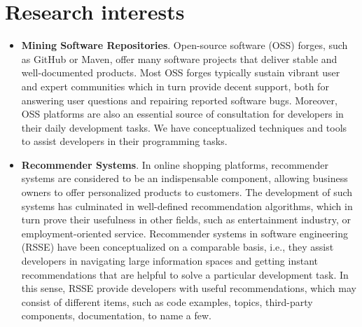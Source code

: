 \documentclass[a4paper,9pt]{article} %
\makeatletter
\newcommand*{\ie}{i.e.,\@\xspace}
\makeatother
\begin{document}
\section{Research interests}
\begin{itemize}
	\item \textbf{Mining Software Repositories}. Open-source software (OSS) forges, such as GitHub or Maven, offer many software projects that deliver stable and well-documented 
	products. Most OSS forges typically sustain vibrant user and expert communities which in turn provide decent support, both for 
	answering user questions and repairing reported software bugs. Moreover, OSS platforms are also an essential source of consultation for 
	developers in their daily development tasks. %
	We have conceptualized techniques and tools %
	to assist developers in their programming tasks.
	\item \textbf{Recommender Systems}. In online shopping platforms, recommender systems are considered to be an indispensable component, allowing business owners to offer 
	personaliz\-ed products to customers. The development of such systems has culminated in well-defined recommendation algorithms, which in turn prove their usefulness in other fields, such as entertainment industry, %
	or employment-oriented service. Recommen\-der systems in software engineering (RSSE) have been conceptualized on a comparable basis, \ie they assist developers in navigating large information spaces and getting instant recommendations that are helpful to solve a particular development task. In this sense, RSSE provide developers with useful recommendations, which may consist of different items, such as code examples, topics, %
	third-party components, documentation, to name a few. 
	

\end{itemize}
\end{document}
